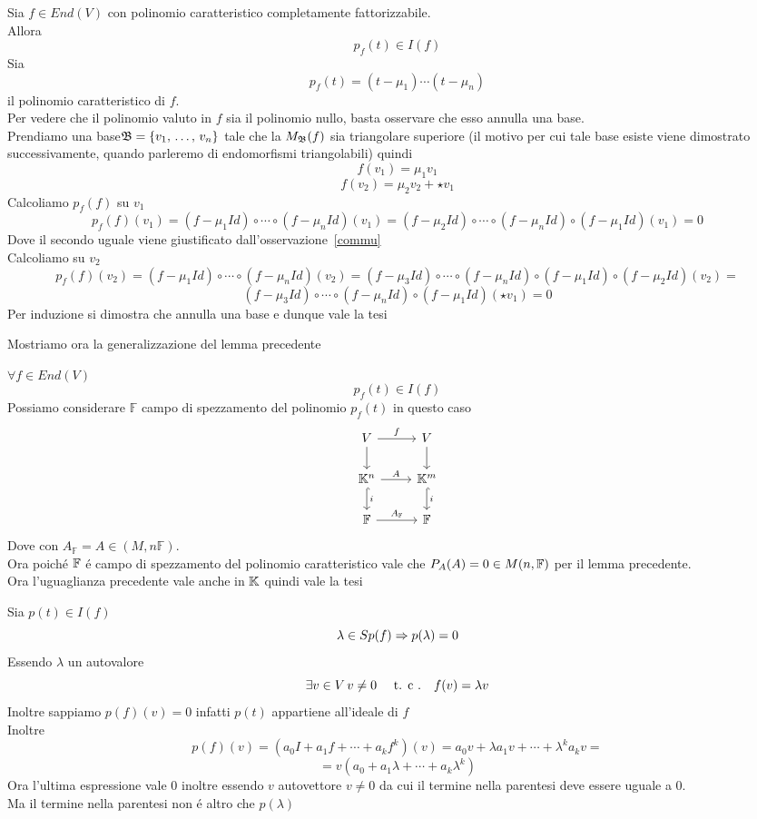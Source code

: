 \begin{lem}
Sia $f\in End(V)$ con polinomio caratteristico completamente fattorizzabile.\\
Allora $$p_f(t) \in I (f)$$
\proof
Sia 
$$ p_f(t)=( t-\mu_1) \cdots ( t-\mu_n)$$
il polinomio caratteristico di $f$.\\
Per vedere che il polinomio valuto in $f$ sia il polinomio nullo, basta osservare che esso annulla una base.\\
Prendiamo una base$\mathfrak{B}=\{ v_1, \, \dots , \, v_n \}$ tale che la $M_{\mathfrak{B}}(f) $ sia triangolare superiore (il motivo per cui tale base esiste viene dimostrato successivamente, quando parleremo di endomorfismi triangolabili) quindi
$$ f(v_1)=\mu_1 v_1 $$
$$ f(v_2)=\mu_2 v_2 + \star v_1 $$
Calcoliamo $p_f(f)$ su $v_1$
$$ p_f(f)(v_1)=( f-\mu_1 Id ) \circ \cdots \circ  ( f-\mu_n Id )(v_1)\bm{= } ( f-\mu_2  Id ) \circ \cdots \circ  ( f-\mu_n Id )\circ (f-\mu_1 Id)(v_1)=0 $$
Dove il secondo uguale viene giustificato dall'osservazione~\ref{commu}\\
Calcoliamo su $v_2$
$$ p_f(f)(v_2)=( f-\mu_1 Id ) \circ \cdots \circ  ( f-\mu_n Id )(v_2)=  ( f-\mu_3  Id ) \circ \cdots \circ  ( f-\mu_n Id )\circ (f-\mu_1 Id)\circ (f-\mu_2 Id) (v_2)= $$$$( f-\mu_3  Id ) \circ \cdots \circ  ( f-\mu_n Id )\circ (f-\mu_1 Id) (\star v_1 )=0  $$
Per induzione si dimostra che annulla una base e dunque vale la tesi \endproof
\end{lem}

Mostriamo ora la generalizzazione del lemma precedente
\begin{thm}\bianco
$\forall f \in End(V)$
$$ p_f(t) \in I(f) $$
\proof Possiamo considerare $\mathbb{F}$ campo di spezzamento del polinomio $p_f(t) $ in questo caso 
$$
\begin{tikzcd} 
V \arrow[r, "f"] \arrow[d,""]
& V  \arrow[d, ]\\ 
\K ^ n \arrow[r, "A"]  \arrow[d,hook,"i"] 
& \K ^ m  \arrow[d,hook,"i"]  \\
\mathbb{F} \arrow{r}{A_\mathbb{F}} 
&\mathbb{F}
\end{tikzcd}
$$
Dove con $A_\mathbb{F} = A \in (M,n \mathbb{F }) $.\\
Ora poich\'e
 $\mathbb{F} $ \'e campo di spezzamento del polinomio caratteristico vale che $ P_A(A)=0\in M(n,\mathbb{F}) $ per il lemma precedente.\\
Ora l'uguaglianza precedente vale anche in $\mathbb{K}$ quindi vale la tesi
\endproof
\end{thm}
\newpage
\begin{lem} Sia $p(t) \in I (f)$
$$ \lambda \in Sp(f) \Rightarrow p(\lambda )=0$$
\proof Essendo $\lambda$ un autovalore 
$$ \exists v \in V \, v\neq 0 \quad \text{ t. c .} \quad f(v)=\lambda v $$
Inoltre sappiamo $p(f)(v)=0 $ infatti $p(t) $ appartiene all'ideale di $f$ \\
Inoltre $$ p(f)(v)= \left( a_0 I + a_1 f + \cdots + a_k f^k\right) (v)=a_0 v + \lambda a_1 v + \cdots + \lambda^k a_k v =$$ 
$$ = v( a_0+ a_1 \lambda + \cdots + a_k \lambda ^k )  $$
Ora l'ultima espressione vale $0$ inoltre essendo $v$ autovettore $v\neq 0 $ da cui il termine nella parentesi deve essere uguale a 0.\\
Ma il termine nella parentesi non \'e altro che $ p(\lambda ) $
\endproof
\end{lem}
